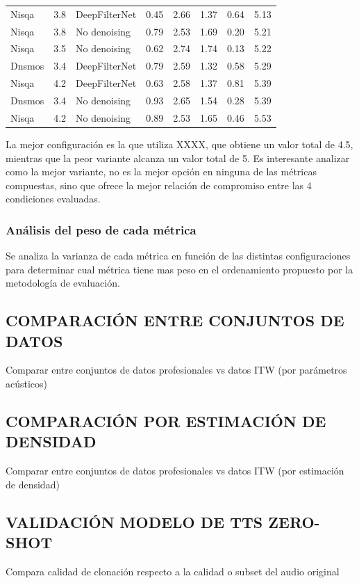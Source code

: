 \begin{table}[ht]
\begin{tabular}{@{} l S l S[table-format=1.2] S[table-format=1.2] S[table-format=1.2] S[table-format=1.2] S[table-format=1.2] @{}}
Nisqa   & 3.8 & DeepFilterNet & 0.45 & 2.66 & 1.37 & 0.64 & 5.13 \\
Nisqa   & 3.8 & No denoising  & 0.79 & 2.53 & 1.69 & 0.20 & 5.21 \\
Nisqa   & 3.5 & No denoising  & 0.62 & 2.74 & 1.74 & 0.13 & 5.22 \\
Dnsmos  & 3.4 & DeepFilterNet & 0.79 & 2.59 & 1.32 & 0.58 & 5.29 \\
Nisqa   & 4.2 & DeepFilterNet & 0.63 & 2.58 & 1.37 & 0.81 & 5.39 \\
Dnsmos  & 3.4 & No denoising  & 0.93 & 2.65 & 1.54 & 0.28 & 5.39 \\
Nisqa   & 4.2 & No denoising  & 0.89 & 2.53 & 1.65 & 0.46 & 5.53 \\
\bottomrule
\end{tabular}
\end{table}

La mejor configuración es la que utiliza XXXX, que obtiene un valor total de 4.5, mientras que la peor variante alcanza un valor total de 5.
Es interesante analizar como la mejor variante, no es la mejor opción en ninguna de las métricas compuestas, sino que ofrece la mejor relación de compromiso entre las 4 condiciones evaluadas.


\subsubsection{Análisis del peso de cada métrica}
Se analiza la varianza de cada métrica en función de las distintas configuraciones para determinar cual métrica tiene mas peso en el ordenamiento propuesto por la metodología de evaluación.

\subsection{COMPARACIÓN ENTRE CONJUNTOS DE DATOS}
Comparar entre conjuntos de datos profesionales vs datos ITW (por parámetros acústicos)

\subsection{COMPARACIÓN POR ESTIMACIÓN DE DENSIDAD}
Comparar entre conjuntos de datos profesionales vs datos ITW (por estimación de densidad)

\subsection{VALIDACIÓN MODELO DE TTS ZERO-SHOT}
Compara calidad de clonación respecto a la calidad o subset del audio original
